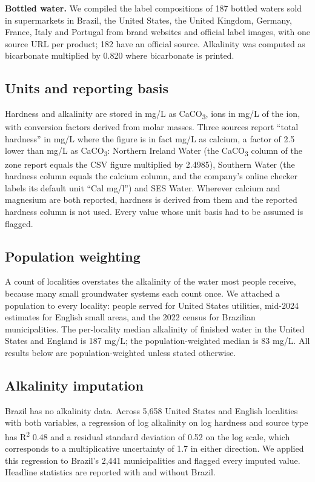 \documentclass[
  a4paper,
]{article}
\begin{document}
\textbf{Bottled water.} We compiled the label compositions of 187
bottled waters sold in supermarkets in Brazil, the United States, the
United Kingdom, Germany, France, Italy and Portugal from brand websites
and official label images, with one source URL per product; 182 have an
official source. Alkalinity was computed as bicarbonate multiplied by
0.820 where bicarbonate is printed.

\subsection{Units and reporting basis}\label{units-and-reporting-basis}

Hardness and alkalinity are stored in mg/L as CaCO\textsubscript{3},
ions in mg/L of the ion, with conversion factors derived from molar
masses. Three sources report ``total hardness'' in mg/L where the figure
is in fact mg/L as calcium, a factor of 2.5 lower than mg/L as
CaCO\textsubscript{3}: Northern Ireland Water (the CaCO\textsubscript{3}
column of the zone report equals the CSV figure multiplied by 2.4985),
Southern Water (the hardness column equals the calcium column, and the
company's online checker labels its default unit ``Cal mg/l'') and SES
Water. Wherever calcium and magnesium are both reported, hardness is
derived from them and the reported hardness column is not used. Every
value whose unit basis had to be assumed is flagged.

\subsection{Population weighting}\label{population-weighting}

A count of localities overstates the alkalinity of the water most people
receive, because many small groundwater systems each count once. We
attached a population to every locality: people served for United States
utilities, mid-2024 estimates for English small areas, and the 2022
census for Brazilian municipalities. The per-locality median alkalinity
of finished water in the United States and England is 187 mg/L; the
population-weighted median is 83 mg/L. All results below are
population-weighted unless stated otherwise.

\subsection{Alkalinity imputation}\label{alkalinity-imputation}

Brazil has no alkalinity data. Across 5,658 United States and English
localities with both variables, a regression of log alkalinity on log
hardness and source type has R\textsuperscript{2} 0.48 and a residual
standard deviation of 0.52 on the log scale, which corresponds to a
multiplicative uncertainty of 1.7 in either direction. We applied this
regression to Brazil's 2,441 municipalities and flagged every imputed
value. Headline statistics are reported with and without Brazil.
\end{document}
